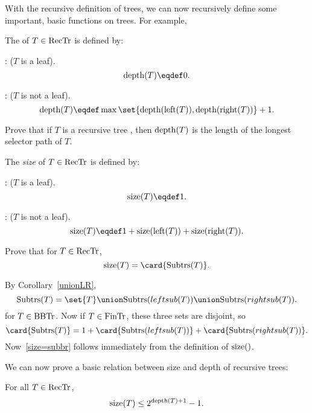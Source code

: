 With the recursive definition of trees, we can now recursively define
some important, basic functions on trees.  For example,

\begin{definition}
The  of $T \in \text{RecTr}$ is defined by:

: ($T$ is a leaf).
\[
\trdpth{T} \eqdef 0.
\]

: ($T$ is not a leaf).
\[
\trdpth{T} \eqdef \max\set{\trdpth{\leftsub{(T)}}, \trdpth{\rightsub{(T)}}} + 1.
\]
\end{definition}

\begin{problem}
Prove that if $T$ is a recursive tree \rectr, then $\text{depth}(T)$ is the
length of the longest selector path of $T$.
\begin{solution}
\end{solution}
\end{problem}

\begin{definition}
The \emph{size} of $T \in \text{RecTr}$ is defined by:

: ($T$ is a leaf).
\[
\sizetr{T} \eqdef 1.
\]

: ($T$ is not a leaf).
\[
\sizetr{T} \eqdef 1 + \sizetr{\leftsub{(T)}} + \sizetr{\rightsub{(T)}}.
\]
\end{definition}

\begin{problem} Prove that for $T \in \text{RecTr}$, 
\begin{equation}\label{size=subbr}
\sizetr{T} = \card{\subbrn{T}}.
\end{equation}


\begin{solution}
By Corollary~\ref{unionLR},
\[
\subbrn{T} = \set{T} \union \subbrn{leftsub{(T)}} \union \subbrn{rightsub{(T)}}.
\]
for $T \in \text{BBTr}$.  Now if $T \in \text{FinTr}$, these three sets are disjoint, so
\[
\card{\subbrn{T}} = 1 + \card{\subbrn{leftsub{(T)}}} + \card{\subbrn{rightsub{(T)}}}.
\]
Now~\eqref{size=subbr} follows immediately from the definition of $\sizetr$.
\end{solution}
\end{problem}


We can now prove a basic relation between size and depth of recursive
trees:
                    \begin{theorem}\label{szT2d1}
For all $T \in \text{RecTr}$,
\[
\text{size}(T) \leq 2^{\text{depth}(T)+1} - 1.
\]
\end{theorem}

